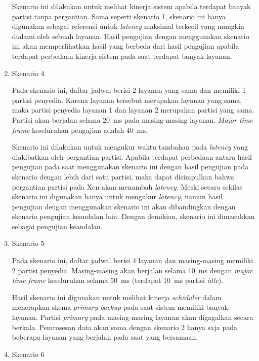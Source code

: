 \begin{enumerate}
		Skenario ini dilakukan untuk melihat kinerja sistem apabila terdapat banyak
		partisi tanpa pergantian. Sama seperti skenario 1, skenario ini hanya digunakan
		sebagai referensi untuk \textit{latency} maksimal terkecil yang mungkin dialami
		oleh sebuah layanan. Hasil pengujian dengan menggunakan skenario ini akan
		memperlihatkan hasil yang berbeda dari hasil pengujian apabila terdapat perbedaan
		kinerja sistem pada saat terdapat banyak layanan.

	\item Skenario 4

		Pada skenario ini, daftar jadwal berisi 2 layanan yang sama dan memiliki 1
		partisi penyedia. Karena layanan tersebut merupakan layanan yang sama, maka
		partisi penyedia layanan 1 dan layanan 2 merupakan partisi yang sama.  Partisi
		akan berjalan selama \SI{20}{\milli\second} pada masing-masing layanan.
		\textit{Major time frame} keseluruhan pengujian adalah \SI{40}{\milli\second}.

		Skenario ini dilakukan untuk mengukur waktu tambahan pada \textit{latency} yang
		diakibatkan oleh pergantian partisi. Apabila terdapat perbedaan antara hasil
		pengujian pada saat menggunakan skenario ini dengan hasil pengujian pada
		skenario dengan lebih dari satu partisi, maka dapat disimpulkan bahwa pergantian
		partisi pada Xen akan menambah \textit{latency}. Meski secara sekilas skenario
		ini digunakan hanya untuk mengukur \textit{latency}, namun hasil pengujian
		dengan menggunakan skenario ini akan dibandingkan dengan skenario pengujian
		keandalan lain. Dengan demikian, skenario ini dimasukkan sebagai pengujian
		keandalan.

	\item Skenario 5

		Pada skenario ini, daftar jadwal berisi 4 layanan dan masing-masing memiliki 2
		partisi penyedia. Masing-masing akan berjalan selama \SI{10}{\milli\second}
		dengan \textit{major time frame} keseluruhan selama \SI{50}{\milli\second}
		(terdapat \SI{10}{\milli\second} partisi \textit{idle}).

		Hasil skenario ini digunakan untuk melihat kinerja \textit{scheduler} dalam
		menerapkan skema \textit{primary-backup} pada saat sistem memiliki banyak
		layanan. Partisi \textit{primary} pada masing-masing layanan akan digagalkan
		secara berkala. Pemrosesan data akan sama dengan skenario 2 hanya saja pada
		beberapa layanan yang berjalan pada saat yang bersamaan.

	\item Skenario 6


\end{enumerate}
